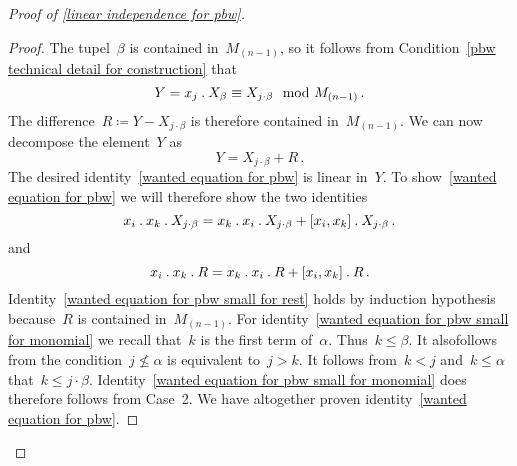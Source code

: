 \begin{proof}[Proof of \cref{linear independence for pbw}]
\begin{description}
      \begin{proof}
        The tupel~$\beta$ is contained in~$M_{(n-1)}$, so it follows from Condition~\ref{pbw technical detail for construction} that
        \[
          Y
          =
          x_j \mathbin{.} X_\beta
          \equiv
          X_{j \cdot \beta}
          \mod
          M_{(n-1)} \,.
        \]
        The difference~$R \coloneqq Y - X_{j \cdot \beta}$ is therefore contained in~$M_{(n-1)}$.
        We can now decompose the element~$Y$ as
        \[
          Y
          =
          X_{j \cdot \beta} + R  \,.
        \]
        The desired identity~\eqref{wanted equation for pbw} is linear in~$Y$.
        To show~\eqref{wanted equation for pbw} we will therefore show the two identities
        \begin{equation}
          \label{wanted equation for pbw small for monomial}
          x_i \mathbin{.} x_k \mathbin{.} X_{j \cdot \beta}
          =
          x_k \mathbin{.} x_i \mathbin{.} X_{j \cdot \beta}
          + [x_i, x_k] \mathbin{.} X_{j \cdot \beta} \,.
        \end{equation}
        and
        \begin{equation}
          \label{wanted equation for pbw small for rest}
          x_i \mathbin{.} x_k \mathbin{.} R
          =
          x_k \mathbin{.} x_i \mathbin{.} R
          + [x_i, x_k] \mathbin{.} R \,.
        \end{equation}
        Identity~\eqref{wanted equation for pbw small for rest} holds by induction hypothesis because~$R$ is contained in~$M_{(n-1)}$.
        For identity~\eqref{wanted equation for pbw small for monomial} we recall that~$k$ is the first term of~$\alpha$.
        Thus~$k \leq \beta$.
        It alsofollows from the condition~$j \nleq \alpha$ is equivalent to~$j > k$.
        It follows from~$k < j$ and~$k \leq \alpha$ that~$k \leq j \cdot \beta$.
        Identity~\ref{wanted equation for pbw small for monomial} does therefore follows from Case~2.
        We have altogether proven identity~\eqref{wanted equation for pbw}.
      \end{proof}


\end{description}
\end{proof}
